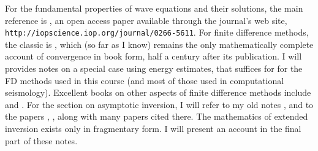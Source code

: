 For the fundamental properties of wave equations and their solutions, the main reference is \cite{BlazekStolkSymes:13}, an open access paper available through the journal's web site, {\tt http://iopscience.iop.org/journal/0266-5611}. For finite difference methods, the classic is \cite{RichtMort}, which (so far as I know) remains the only mathematically complete account of convergence in book form, half a century after its publication. I will provides notes on a special case using energy estimates, that suffices for for the FD methods used in this course (and most of those used in computational seismology). Excellent books on other aspects of finite difference methods include \cite{Cohen:01} and \cite{Leveque:07}. For the section on asymptotic inversion, I will refer to my old notes \cite[]{SymesNotes}, and to the papers \cite[]{HouSymes:15}, \cite[]{HouSymes:17}, along with many papers cited there. The mathematics of extended inversion exists only in fragmentary form. I will present an account in the final part of these notes.



